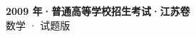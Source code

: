 \documentclass[zihao=-4, a4paper]{ctexart}
\begin{document}
\begin{center}
  {\Large\bfseries 2009 年·普通高等学校招生考试·江苏卷}\\[4pt]
  {\large 数学 · 试题版}
\end{center}
\medskip
{}

\end{document}
